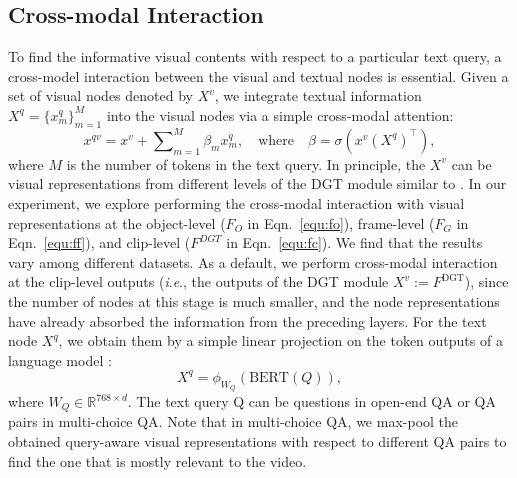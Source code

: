 \documentclass[runningheads]{llncs}
\newcommand{\ie}{\textit{i}.\textit{e}.}
\begin{document}
\subsection{Cross-modal Interaction}
\label{sec:cm}
To find the informative visual contents with respect to a particular text query, a cross-model interaction between the visual and textual nodes is essential. Given a set of visual nodes denoted by $X^v$, we integrate textual information $X^q=\{x_m^q\}_{m=1}^M$   into the visual nodes via a simple cross-modal attention:
\begin{equation}
x^{qv} = x^v + \sum\nolimits_{m=1}^M \beta_m x^q_m, \quad \text{where} \quad \beta = \sigma(x^v(X^q)^\top),
\end{equation}
where $M$ is the number of tokens in the text query. 
In principle, the $X^v$ can be visual representations from different levels of the DGT module similar to \cite{xiao2021video}. In our experiment, we explore performing the cross-modal interaction with visual representations at the object-level ($F_O$ in Eqn.~\eqref{equ:fo}), frame-level ($F_G$ in Eqn.~\eqref{equ:ff}), and  clip-level ($F^{DGT}$ in Eqn.~\eqref{equ:fc}). We find that the results vary among different datasets. As a default, we perform cross-modal interaction at the clip-level outputs (\ie, the outputs of the DGT module $X^v:=F^{\text{DGT}}$), since the number of nodes at this stage is much smaller, and the node representations have already absorbed the information from the preceding layers. For the text node $X^q$, we obtain them by a simple linear projection on the token outputs of a language model \cite{devlin2018bert}: \begin{equation}
\label{equ:bproj}
    X^q=\phi_{W_Q}(\text{BERT}(Q)),
\end{equation}
where $W_Q\in\mathbb{R}^{768 \times d}$. The text query Q can be questions in open-end QA or QA pairs in multi-choice QA. Note that in multi-choice QA, we max-pool the obtained query-aware visual representations with respect to different QA pairs to find the one that is mostly relevant to the video. 
\end{document}

